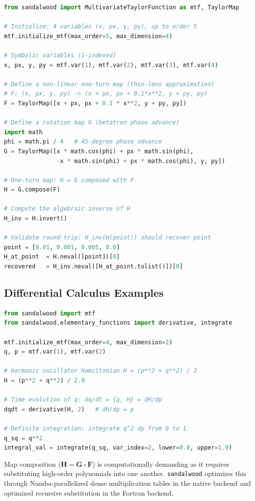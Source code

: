 \documentclass[aps,prb,reprint,superscriptaddress,nofootinbib]{revtex4-2}
\begin{document}
\begin{lstlisting}[language=Python, caption=Map composition and inversion in \texttt{sandalwood}]
from sandalwood import MultivariateTaylorFunction as mtf, TaylorMap

# Initialize: 4 variables (x, px, y, py), up to order 5
mtf.initialize_mtf(max_order=5, max_dimension=4)

# Symbolic variables (1-indexed)
x, px, y, py = mtf.var(1), mtf.var(2), mtf.var(3), mtf.var(4)

# Define a non-linear one-turn map (thin-lens approximation)
# F: (x, px, y, py) -> (x + px, px + 0.1*x**2, y + py, py)
F = TaylorMap([x + px, px + 0.1 * x**2, y + py, py])

# Define a rotation map G (betatron phase advance)
import math
phi = math.pi / 4   # 45-degree phase advance
G = TaylorMap([x * math.cos(phi) + px * math.sin(phi),
               -x * math.sin(phi) + px * math.cos(phi), y, py])

# One-turn map: H = G composed with F
H = G.compose(F)

# Compute the algebraic inverse of H
H_inv = H.invert()

# Validate round-trip: H_inv(H(point)) should recover point
point = [0.01, 0.001, 0.005, 0.0]
H_at_point  = H.neval([point])[0]
recovered   = H_inv.neval([H_at_point.tolist()])[0]
\end{lstlisting}

\subsection{Differential Calculus Examples}

\begin{lstlisting}[language=Python, caption=Poisson bracket and definite integration]
from sandalwood import mtf
from sandalwood.elementary_functions import derivative, integrate

mtf.initialize_mtf(max_order=4, max_dimension=2)
q, p = mtf.var(1), mtf.var(2)

# Harmonic oscillator Hamiltonian H = (p**2 + q**2) / 2
H = (p**2 + q**2) / 2.0

# Time evolution of q: dq/dt = {q, H} = dH/dp
dqdt = derivative(H, 2)   # dH/dp = p

# Definite integration: integrate q^2 dp from 0 to 1
q_sq = q**2
integral_val = integrate(q_sq, var_index=2, lower=0.0, upper=1.0)
\end{lstlisting}

Map composition ($\mathbf{H} = \mathbf{G} \circ \mathbf{F}$) is computationally demanding as it requires substituting high-order polynomials into one another. \texttt{sandalwood} optimizes this through Numba-parallelized dense multiplication tables in the native backend and optimized recursive substitution in the Fortran backend.
\end{document}

